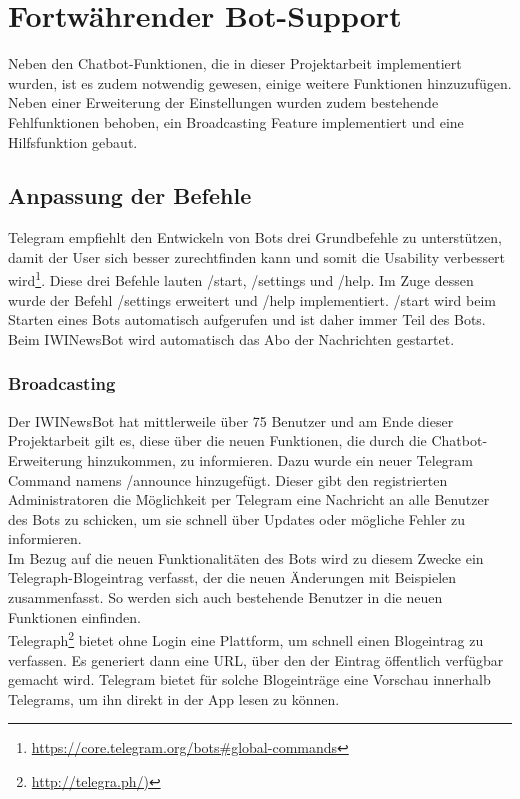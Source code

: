\chapter{Fortwährender Bot-Support}
Neben den Chatbot-Funktionen, die in dieser Projektarbeit implementiert wurden, ist es zudem notwendig gewesen, einige weitere Funktionen hinzuzufügen. Neben einer Erweiterung der Einstellungen wurden zudem bestehende Fehlfunktionen behoben, ein Broadcasting Feature implementiert und eine Hilfsfunktion gebaut.

\section{Anpassung der Befehle}
Telegram empfiehlt den Entwickeln von Bots drei Grundbefehle zu unterstützen, damit der User sich besser zurechtfinden kann und somit die Usability verbessert wird\footnote{\url{https://core.telegram.org/bots\#global-commands}}.
Diese drei Befehle lauten /start, /settings und /help. Im Zuge dessen wurde der Befehl /settings erweitert und /help implementiert. /start wird beim Starten eines Bots automatisch aufgerufen und ist daher immer Teil des Bots. Beim IWINewsBot wird automatisch das Abo der Nachrichten gestartet.

\subsection{Broadcasting}
Der IWINewsBot hat mittlerweile über 75 Benutzer und am Ende dieser Projektarbeit gilt es, diese über die neuen Funktionen, die durch die Chatbot-Erweiterung hinzukommen, zu informieren. Dazu wurde ein neuer Telegram Command namens /announce hinzugefügt. Dieser gibt den registrierten Administratoren die Möglichkeit per Telegram eine Nachricht an alle Benutzer des Bots zu schicken, um sie schnell über Updates oder mögliche Fehler zu informieren. \\
Im Bezug auf die neuen Funktionalitäten des Bots wird zu diesem Zwecke ein Telegraph-Blogeintrag verfasst, der die neuen Änderungen mit Beispielen zusammenfasst. So werden sich auch bestehende Benutzer in die neuen Funktionen einfinden. \\
Telegraph\footnote{\url{http://telegra.ph/)}} bietet ohne Login eine Plattform, um schnell einen Blogeintrag zu verfassen. Es generiert dann eine URL, über den der Eintrag öffentlich verfügbar gemacht wird. Telegram bietet für solche Blogeinträge eine Vorschau innerhalb Telegrams, um ihn direkt in der App lesen zu können.

